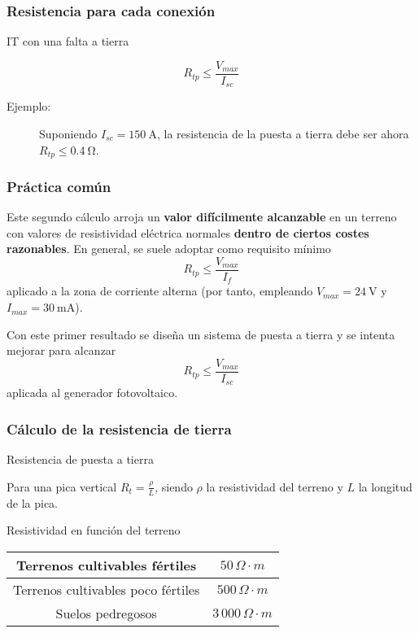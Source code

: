 \documentclass[serif, xcolor=dvipsnames]{beamer}
\begin{document}
\begin{frame}
\frametitle{Resistencia para cada conexión}
\begin{block}
{IT con una falta a tierra}

\[
R_{tp}\leq\frac{V_{max}}{I_{sc}}\]

\begin{description}
\item [{Ejemplo:}] Suponiendo $I_{sc}=\SI{150}{\ampere}$, la resistencia
de la puesta a tierra debe ser ahora $R_{tp}\leq\SI{0.4}{\ohm}$.
\end{description}
\end{block}

\end{frame}

\begin{frame}
\frametitle{Práctica común}

Este segundo cálculo arroja un \textbf{valor difícilmente alcanzable}
en un terreno con valores de resistividad eléctrica normales \textbf{dentro
de ciertos costes razonables}. En general, se suele adoptar como requisito
mínimo \[
R_{tp}\leq\frac{V_{max}}{I_{f}}\]
 aplicado a la zona de corriente alterna (por tanto, empleando $V_{max}=\SI{24}{\volt}$
y $I_{max}=\SI{30}{\milli\ampere}$). 

Con este primer resultado se diseña un sistema de puesta a tierra
y se intenta mejorar para alcanzar \[
R_{tp}\leq\frac{V_{max}}{I_{sc}}\]
aplicada al generador fotovoltaico.


\end{frame}

\begin{frame}
\frametitle{Cálculo de la resistencia de tierra}
\begin{block}
{Resistencia de puesta a tierra}

Para una pica vertical $R_{t}=\frac{\rho}{L}$, siendo $\rho$ la
resistividad del terreno y $L$ la longitud de la pica.

\end{block}
{}
\begin{block}
{Resistividad en función del terreno}

\begin{tabular}{cc}
\toprule 
Terrenos cultivables fértiles & $50\,\Omega\cdot m$\tabularnewline
\midrule 
Terrenos cultivables poco fértiles & $500\,\Omega\cdot m$\tabularnewline
\midrule 
Suelos pedregosos & $3\,000\,\Omega\cdot m$\tabularnewline
\bottomrule
\end{tabular}

\end{block}
{}


\end{frame}
\end{document}
